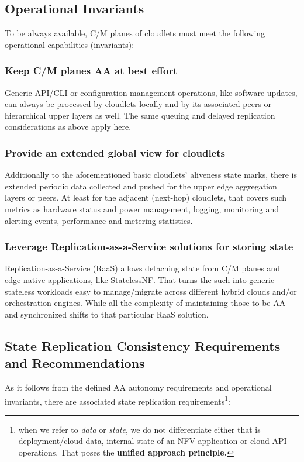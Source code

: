 \documentclass[conference]{IEEEtran}
\begin{document}
\subsection{Operational Invariants}
To be always available, C/M planes of cloudlets must meet the following
operational capabilities (invariants):

\subsubsection{Keep C/M planes AA at best effort}
Generic API/CLI or configuration management operations, like software updates,
can always be processed by cloudlets locally and by its associated peers or
hierarchical upper layers as well. The same queuing and delayed replication
considerations as above apply here.

\subsubsection{Provide an extended global view for cloudlets}
Additionally to the aforementioned basic cloudlets' aliveness state marks,
there is extended periodic data collected and pushed for the upper edge
aggregation layers or peers. At least for the adjacent (next-hop) cloudlets,
that covers such metrics as hardware status and power management, logging,
monitoring and alerting events, performance and metering statistics.

\subsubsection{Leverage Replication-as-a-Service solutions for storing state}
Replication-as-a-Service (RaaS) allows detaching state from C/M planes and
edge-native applications, like StatelessNF\cite{b16}. That turns the such into
generic stateless workloads easy to manage/migrate across different hybrid
clouds and/or orchestration engines. While all the complexity of maintaining
those to be AA and synchronized shifts to that particular RaaS solution.

\subsection{State Replication Consistency Requirements and Recommendations}
As it follows from the defined AA autonomy requirements and operational
invariants, there are associated state replication requirements\footnote{when
we refer to \textit{data} or \textit{state}, we do not differentiate either
that is deployment/cloud data, internal state of an NFV application or cloud
API operations. That poses the \textbf{unified approach principle.}}:
\end{document}
